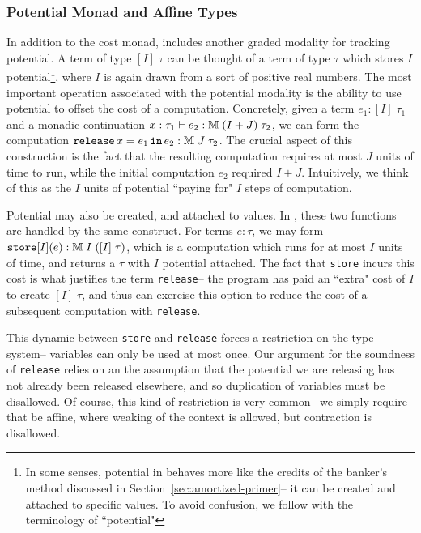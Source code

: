 \subsubsection{Potential Monad and Affine Types}
In addition to the cost monad, \lambdaamor includes another graded modality for tracking potential. A term of type $[I] \; \tau$ can be thought of a term of type $\tau$ which stores $I$ potential\footnote{
In some senses, potential in \lambdaamor behaves more like the credits of the banker's method discussed in Section~\ref{sec:amortized-primer}-- it can be created and attached to specific values. To avoid confusion, we follow \citet{rajani-et-al:popl21} with the terminology of ``potential"
}, where $I$ is again drawn from a sort of positive real numbers.
The most important operation associated with the potential modality is the ability to use potential to offset the cost of a computation. Concretely, given a term $e_1 : [I] \; \tau_1$ and a monadic continuation $x : \tau_1 \vdash e_2 : \mathbb{M} \; (I + J) \; \tau_2$, we can form the computation $\texttt{release}\, x = e_1 \, \texttt{in}\, e_2 : \mathbb{M} \; J \; \tau_2$. The crucial aspect of this construction is the fact that the resulting computation requires at most $J$ units of time to run, while the initial computation $e_2$ required $I + J$. Intuitively, we think of this as the $I$ units of potential ``paying for" $I$ steps of computation.

Potential may also be created, and attached to values. In \lambdaamor, these two functions are handled by the same construct. For terms $e : \tau$, we may form $\texttt{store}[I](e) : \mathbb{M} \; I \; ([I] \; \tau)$, which is a computation which runs for at most $I$ units of time, and returns a $\tau$ with $I$ potential attached. The fact that \texttt{store} incurs this cost is what justifies the term \texttt{release}-- the program has paid an ``extra" cost of $I$ to create $[I] \; \tau$, and thus can exercise this option to reduce the cost of a subsequent computation with \texttt{release}.

This dynamic between \texttt{store} and \texttt{release} forces a restriction on the type system-- variables can only be used at most once. Our argument for the soundness of \texttt{release} relies on an the assumption that the potential we are releasing has not already been released elsewhere, and so duplication of variables must be disallowed. Of course, this kind of restriction is very common-- we simply require that \lambdaamor be affine, where weaking of the context is allowed, but contraction is disallowed. 

